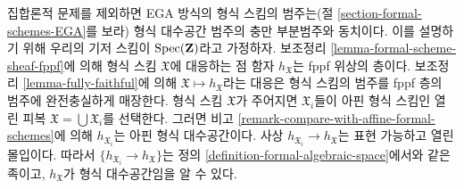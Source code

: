 \begin{remark}
\label{remark-compare-with-formal-schemes}
집합론적 문제를 제외하면 EGA 방식의 형식 스킴의 범주는(절
\ref{section-formal-schemes-EGA}를 보라) 형식 대수공간 범주의
충만 부분범주와 동치이다. 이를 설명하기 위해 우리의 기저 스킴이
$\mathop{\mathrm{Spec}}(\mathbf{Z})$라고 가정하자. 보조정리
\ref{lemma-formal-scheme-sheaf-fppf}에 의해 형식 스킴
$\mathfrak X$에 대응하는 점 함자 $h_\mathfrak X$는 fppf 위상의
층이다. 보조정리 \ref{lemma-fully-faithful}에 의해
$\mathfrak X \mapsto h_\mathfrak X$라는 대응은 형식 스킴의 범주를
fppf 층의 범주에 완전충실하게 매장한다. 형식 스킴
$\mathfrak X$가 주어지면 $\mathfrak X_i$들이 아핀 형식 스킴인
열린 피복 $\mathfrak X = \bigcup \mathfrak X_i$를 선택한다.
그러면 비고 \ref{remark-compare-with-affine-formal-schemes}에 의해
$h_{\mathfrak X_i}$는 아핀 형식 대수공간이다. 사상
$h_{\mathfrak X_i} \to h_\mathfrak X$는 표현 가능하고 열린
몰입이다. 따라서 $\{h_{\mathfrak X_i} \to h_\mathfrak X\}$는
정의 \ref{definition-formal-algebraic-space}에서와 같은 족이고,
$h_\mathfrak X$가 형식 대수공간임을 알 수 있다.
\end{remark}

